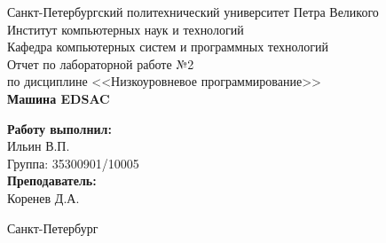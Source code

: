 

    \begin{titlepage}

        \begin{center}

            \large Санкт-Петербургский политехнический университет Петра Великого\\
            \large Институт компьютерных наук и технологий \\
            \large Кафедра компьютерных систем и программных технологий\\[6cm]

            \huge Отчет по лабораторной работе №2\\[0.5cm]
            \large по дисциплине <<Низкоуровневое программирование>>\\[0.1cm]
            \large\textbf{Машина EDSAC}\\[5cm]

        \end{center}


        \begin{flushright}
            \begin{minipage}{0.25\textwidth}
                \begin{flushleft}

                    \large\textbf{Работу выполнил:}\\
                    \large Ильин В.П.\\
                    \large {Группа:} 35300901/10005\\

                    \large \textbf{Преподаватель:}\\
                    \large Коренев Д.А.

                \end{flushleft}
            \end{minipage}
        \end{flushright}

        \vfill

        \begin{center}
            \large Санкт-Петербург\\
            \large \the\year
        \end{center}

    \end{titlepage}
    \vfill
    \newpage
    \renewcommand\contentsname{\centerline{Содержание}}
    \tableofcontents
    \newpage
    \pagestyle{fancy}
    \setlength{\headheight}{14.5pt}
    \renewcommand{\sectionmark}[1]{\markright{#1}}

